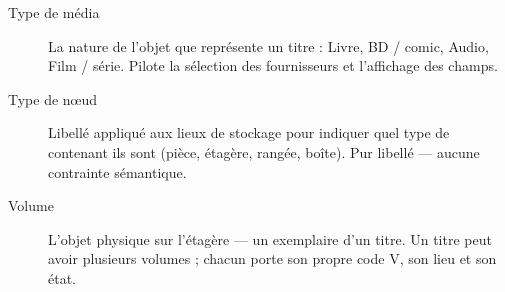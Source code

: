 \begin{description}
  \item[Type de média] La nature de l'objet
        que représente un titre : Livre, BD / comic, Audio, Film /
        série. Pilote la sélection des fournisseurs et l'affichage
        des champs.

  \item[Type de nœud] Libellé appliqué aux
        lieux de stockage pour indiquer quel type de contenant
        ils sont (pièce, étagère, rangée, boîte). Pur libellé —
        aucune contrainte sémantique.

  \item[Volume] L'objet physique sur l'étagère — un
        exemplaire d'un titre. Un titre peut avoir plusieurs
        volumes ; chacun porte son propre code V, son lieu et son
        état.

\end{description}
